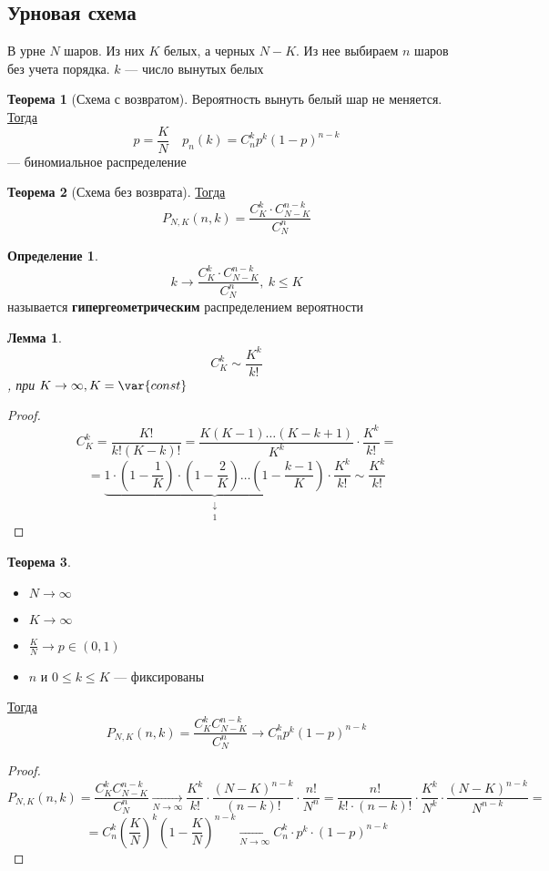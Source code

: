 \documentclass[english]{article}
\newcommand{\const}{\var{const}}
\theoremstyle{plain}
\newtheorem{lemma}{Лемма}
\theoremstyle{remark}
\theoremstyle{definition}
\newtheorem{theorem}{Теорема}[section]
\newtheorem*{definition}{Определение}
\begin{document}
\subsection{Урновая схема}
\label{sec:org8dfb43c}
В урне \(N\) шаров. Из них \(K\) белых, а черных \(N - K\). Из нее выбираем \(n\) шаров без учета порядка. \(k\) --- число вынутых белых
\begin{theorem}[Схема с возвратом]
Вероятность вынуть белый шар не меняется. \\
\uline{Тогда} \[ p = \frac{K}{N}\quad p_n(k) = C^k_np^k(1 - p)^{n - k} \]
--- биномиальное распределение
\end{theorem}
\begin{theorem}[Схема без возврата]
\uline{Тогда} \[ P_{N,K}(n, k) = \frac{C^k_K\cdot C^{n-k}_{N - K}}{C^n_N} \]
\end{theorem}
\begin{definition}
\[ k \to \frac{C^k_K\cdot C^{n - k}_{N - K}}{C^n_N},\ k \le K \]
называется \textbf{гипергеометрическим} распределением вероятности
\end{definition}
\begin{lemma}
\[ C^k_K \sim \frac{K^k}{k!} \]
, при \(K \to \infty, K = \const\)
\end{lemma}
\begin{proof}
\[ C^k_K = \frac{K!}{k!(K - k)!} = \frac{K(K - 1)\dots(K - k + 1)}{K^k}\cdot \frac{K^k}{k!} = \]
\[ = \underbrace{1 \cdot \left(1 - \frac{1}{K}\right)\cdot\left(1 - \frac{2}{K}\right) \dots \left(1 - \frac{k - 1}{K}\right)}_{\substack{\downarrow \\ 1}} \cdot\frac{K^k}{k!} \sim \frac{K^k}{k!}\]
\end{proof}
\begin{theorem}
\-
\begin{itemize}
\item \(N \to \infty\)
\item \(K \to \infty\)
\item \(\frac{K}{N} \to p \in (0, 1)\)
\item \(n\) и \(0 \le k \le K\) --- фиксированы
\end{itemize}
\uline{Тогда} \[ P_{N,K}(n,k) = \frac{C^k_KC^{n - k}_{N - K}}{C^n_N} \to C^k_np^k(1 - p)^{n - k} \]
\end{theorem}
\begin{proof}
\[ P_{N, K}(n, k) = \frac{C^k_KC^{n - k}_{N - K}}{C^n_N} \xrightarrow[N \to \infty]{} \frac{K^k}{k!}\cdot \frac{(N -K)^{n - k}}{(n - k)!}\cdot \frac{n!}{N^n} = \frac{n!}{k!\cdot(n- k)!}\cdot \frac{K^k}{N^k}\cdot\frac{(N - K)^{n - k}}{N^{n - k}} = \]
\[ = C^k_n\left(\frac{K}{N}\right)^k\left(1 - \frac{K}{N}\right)^{n -k} \xrightarrow[N \to \infty]{} C^k_n\cdot p^k \cdot ( 1- p)^{n - k}\]
\end{proof}
\end{document}
